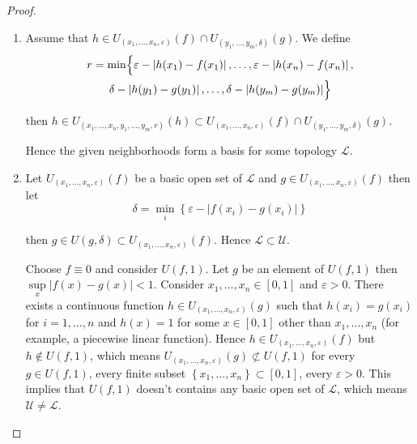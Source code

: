 \begin{proof}
    \begin{enumerate}[label={(\alph*)}]
        \item Assume that \( h \in U_{(x_{1}, \ldots, x_{n}, \varepsilon)}(f) \cap U_{(y_{1}, \ldots, y_{m}, \delta)}(g) \). We define
              \begin{multline*}
                  r = \min\Bigl\{ \varepsilon - \left\vert h(x_{1}) - f(x_{1}) \right\vert, \ldots, \varepsilon - \left\vert h(x_{n}) - f(x_{n}) \right\vert, \\
                  \delta - \left\vert h(y_{1}) - g(y_{1}) \right\vert, \ldots, \delta - \left\vert h(y_{m}) - g(y_{m}) \right\vert \Bigr\}
              \end{multline*}

              then \( h \in U_{(x_{1}, \ldots, x_{n}, y_{1}, \ldots, y_{m}, r)}(h) \subset U_{(x_{1}, \ldots, x_{n}, \varepsilon)}(f) \cap U_{(y_{1}, \ldots, y_{m}, \delta)}(g) \).

              Hence the given neighborhoods form a basis for some topology \( \mathscr{L} \).
        \item Let \( U_{(x_{1}, \ldots, x_{n}, \varepsilon)}(f) \) be a basic open set of \( \mathscr{L} \) and \( g \in U_{(x_{1}, \ldots, x_{n}, \varepsilon)}(f) \) then let
              \[
                  \delta = \min\limits_{i}\left\{ \varepsilon - \left\vert f(x_{i}) - g(x_{i}) \right\vert \right\}
              \]

              then \( g \in U(g, \delta) \subset U_{(x_{1}, \ldots, x_{n}, \varepsilon)}(f) \). Hence \( \mathscr{L} \subset \mathscr{U} \).

              Choose \( f \equiv 0 \) and consider \( U(f, 1) \). Let \( g \) be an element of \( U(f, 1) \) then \( \sup\limits_{x}\left\vert f(x) - g(x) \right\vert < 1 \). Consider \( x_{1}, \ldots, x_{n} \in [0, 1] \) and \( \varepsilon > 0 \). There exists a continuous function \( h \in U_{(x_{1}, \ldots, x_{n}, \varepsilon)}(g) \) such that \( h(x_{i}) = g(x_{i}) \) for \( i = 1, \ldots, n \) and \( h(x) = 1 \) for some \( x \in [0, 1] \) other than \( x_{1}, \ldots, x_{n} \) (for example, a piecewise linear function). Hence \( h \in U_{(x_{1}, \ldots, x_{n}, \varepsilon)}(f) \) but \( h \notin U(f, 1) \), which means \( U_{(x_{1}, \ldots, x_{n}, \varepsilon)}(g) \not\subset U(f, 1) \) for every \( g \in U(f, 1) \), every finite subset \( \left\{ x_{1}, \ldots, x_{n} \right\} \subset [0, 1] \), every \( \varepsilon > 0 \). This implies that \( U(f, 1) \) doesn't contains any basic open set of \( \mathscr{L} \), which means \( \mathscr{U} \ne \mathscr{L} \).


\end{enumerate}
\end{proof}
